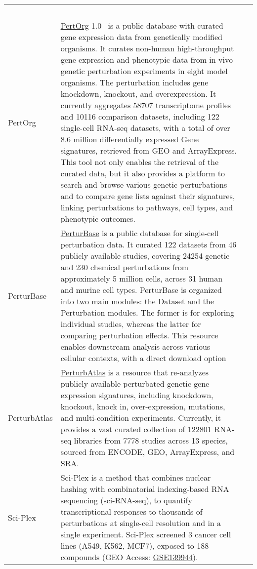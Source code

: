 \begin{newpdflayout}{210mm}{297mm}
\begin{center}
\begin{longtable}{@{} p{} p{} p{} @{}}
  ~\cite{RN120} \\
PertOrg &
  \href{http://www.inbirg.com/pertorg/home}{PertOrg} 1.0~\cite{RN87} is a public database with curated gene expression data from genetically modified organisms. It curates non-human high-throughput gene expression and phenotypic data from in vivo genetic perturbation experiments in eight model organisms. The perturbation includes gene knockdown, knockout, and overexpression. It currently aggregates 58707 transcriptome profiles and 10116 comparison datasets, including 122 single-cell RNA-seq datasets, with a total of over 8.6 million differentially expressed \gls{Gene signature}s, retrieved from GEO and ArrayExpress. This tool not only enables the retrieval of the curated data, but it also provides a platform to search and browse various genetic perturbations and to compare gene lists against their signatures, linking perturbations to pathways, cell types, and phenotypic outcomes. &
  ~\cite{RN85} \\
PerturBase &
  \href{http://www.perturbase.cn/}{PerturBase} is a public database for single-cell perturbation data. It curated 122 datasets from 46 publicly available studies, covering 24254 genetic and 230 chemical perturbations from approximately 5 million cells, across 31 human and murine cell types. PerturBase is organized into two main modules: the Dataset and the Perturbation modules. The former is for exploring individual studies, whereas the latter for comparing perturbation effects. This resource enables downstream analysis across various cellular contexts, with a direct download option &
  ~\cite{RN97} \\
PerturbAtlas &
  \href{https://perturbatlas.kratoss.site/#/}{PerturbAtlas} is a resource that re-analyzes publicly available perturbated genetic gene expression signatures, including knockdown, knockout, knock in, over-expression, mutations, and multi-condition experiments. Currently, it provides a vast curated collection of 122801 RNA-seq libraries from 7778 studies across 13 species, sourced from ENCODE, GEO, ArrayExpress, and SRA. &
  ~\cite{RN129} \\
Sci-Plex &
  Sci-Plex is a method that combines nuclear hashing with combinatorial indexing-based RNA sequencing (sci-RNA-seq), to quantify transcriptional responses to thousands of perturbations at single-cell resolution and in a single experiment. Sci-Plex screened 3 cancer cell lines (A549, K562, MCF7), exposed to 188 compounds (GEO Access: \href{https://www.ncbi.nlm.nih.gov/geo/query/acc.cgi?acc=GSE139944}{GSE139944}). &

\end{longtable}
\end{center}
\end{newpdflayout}
